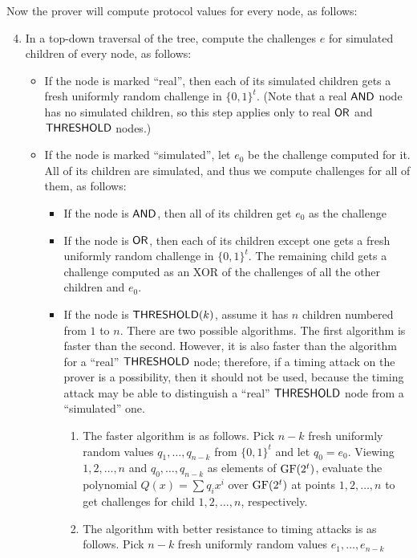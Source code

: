 \documentclass[11pt]{llncs}
\begin{document}
\noindent
Now the prover will compute protocol values for every node, as follows:

\begin{enumerate}
\setcounter{enumi}{3}
    \item In a top-down traversal of the tree, compute the challenges $e$ for simulated children of every node, as follows:
    \begin{itemize}
        \item If the node is marked ``real'', then each of its simulated children gets  a fresh uniformly random challenge in $\{0,1\}^t$. (Note that a real $\mathsf{AND}$ node has no simulated children, so this step applies only to real $\mathsf{OR}$ and $\mathsf{THRESHOLD}$ nodes.)
        \item If the node is marked ``simulated'', let $e_0$ be the challenge computed for it.  All of its children are simulated, and thus we compute challenges for all of them, as follows:
        \begin{itemize}
            \item If the node is $\mathsf{AND}$,  then all of its children get $e_0$ as the challenge
            \item If the node is $\mathsf{OR}$, then each of its children except one gets a fresh uniformly random challenge in $\{0,1\}^t$. The remaining child gets a challenge computed as an XOR of the challenges of all the other children and $e_0$.
            \item If the node is $\mathsf{THRESHOLD}(k)$, assume it has $n$ children numbered from $1$ to $n$. There are two possible algorithms. The first algorithm is faster than the second. However, it is also faster than the algorithm for a ``real'' $\mathsf{THRESHOLD}$ node; therefore, if a timing attack on the prover is a possibility, then it should not be used, because the timing attack may be able to distinguish a ``real'' $\mathsf{THRESHOLD}$ node from a ``simulated'' one.
            \begin{enumerate} 
            	\item The faster algorithm is as follows. Pick  $n-k$ fresh uniformly random values $q_1, \dots, q_{n-k}$ from $\{0,1\}^t$ and let
	         $q_0=e_0$. Viewing $1, 2, \dots, n$ and $q_0, \dots, q_{n-k}$ as elements of $\mathrm{GF}(2^t)$, 
	         evaluate the polynomial $Q(x) = \sum {q_i x^i}$ over $\mathrm{GF}(2^t)$ at points $1, 2, \dots, n$
	         to get challenges for child $1, 2, \dots, n$, respectively.
	         \item The algorithm with better resistance to timing attacks is as follows. Pick $n-k$ fresh uniformly random values $e_1, \dots, e_{n-k}$

\end{enumerate}
\end{itemize}
\end{itemize}
\end{enumerate}
\end{document}
